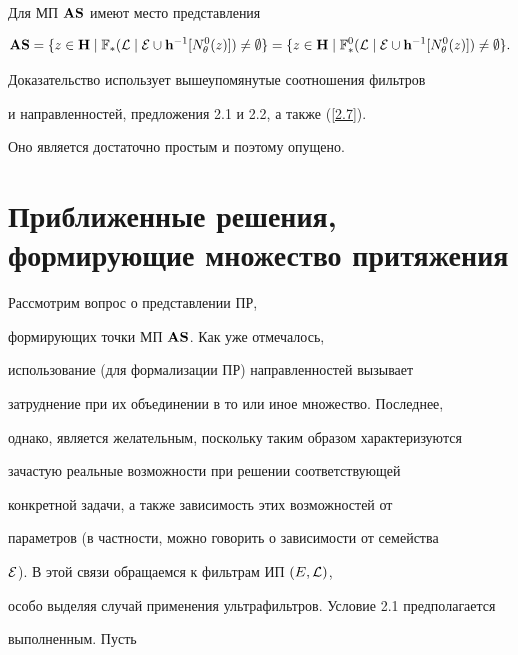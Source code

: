 {\begin{thms}
Для МП ${\bold A}{\bold S}$ имеют место представления


$$


{{\bold A}{\bold S}} = \{z \in {\bold H} \mid {{\Bbb F}_*}({\cal


L}\mid{\cal E}\cup{{\bold h}^{-1}}[{N_\theta^0}(z)]) \ne \emp\} =


\{z \in {\bold H} \mid {{\Bbb F}_*^0}({\cal


L}\mid{\cal E}\cup{{\bold h}^{-1}}[{N_\theta^0}(z)]) \ne \emp\}.


$$


\end{thms}





Доказательство использует вышеупомянутые соотношения фильтров


и направленностей, предложения 2.1 и 2.2, а также (\ref{2.7}).


Оно является достаточно простым и поэтому опущено.








\section{Приближенные решения, формирующие множество притяжения}





Рассмотрим вопрос о представлении ПР,


формирующих точки МП ${\bold A}{\bold S}$. Как уже отмечалось,


использование (для формализации ПР) направленностей вызывает


затруднение при их объединении в то или иное множество. Последнее,


однако, является желательным, поскольку таким образом характеризуются


зачастую реальные возможности при решении соответствующей


конкретной задачи, а также зависимость этих возможностей от


параметров (в частности, можно говорить о зависимости от семейства


${\cal E}$). В этой связи обращаемся к фильтрам ИП $(E,{\cal L})$,


особо выделяя случай применения ультрафильтров. Условие 2.1 предполагается


выполненным. Пусть


}
